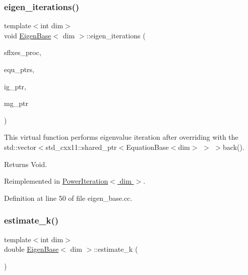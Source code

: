 \subsubsection{\texorpdfstring{eigen\+\_\+iterations()}{eigen\_iterations()}}
{\footnotesize\ttfamily template$<$int dim$>$ \\
void \hyperlink{class_eigen_base}{Eigen\+Base}$<$ dim $>$\+::eigen\+\_\+iterations (\begin{DoxyParamCaption}\item[{std\+::vector$<$ Vector$<$ double $>$ $>$ \&}]{sflxes\+\_\+proc,  }\item[{std\+::vector$<$ std\+\_\+cxx11\+::shared\+\_\+ptr$<$ \hyperlink{class_equation_base}{Equation\+Base}$<$ dim $>$ $>$ $>$ \&}]{equ\+\_\+ptrs,  }\item[{std\+\_\+cxx11\+::shared\+\_\+ptr$<$ \hyperlink{class_i_g_base}{I\+G\+Base}$<$ dim $>$ $>$}]{ig\+\_\+ptr,  }\item[{std\+\_\+cxx11\+::shared\+\_\+ptr$<$ \hyperlink{class_m_g_base}{M\+G\+Base}$<$ dim $>$ $>$}]{mg\+\_\+ptr }\end{DoxyParamCaption})\hspace{0.3cm}{\ttfamily [virtual]}}

This virtual function performs eigenvalue iteration after overriding with the std\+::vector$<$std\+\_\+cxx11\+::shared\+\_\+ptr$<$Equation\+Base$<$dim$>$ $>$ $>$back().

\begin{DoxyReturn}{Returns}
Void. 
\end{DoxyReturn}


Reimplemented in \hyperlink{class_power_iteration_a583586002126f8b7a523e95327047cba}{Power\+Iteration$<$ dim $>$}.



Definition at line 50 of file eigen\+\_\+base.\+cc.

\mbox{\label{class_eigen_base_a1ad5ce67d3534960731d34691db2f4d9}} 
\subsubsection{\texorpdfstring{estimate\+\_\+k()}{estimate\_k()}}
{\footnotesize\ttfamily template$<$int dim$>$ \\
double \hyperlink{class_eigen_base}{Eigen\+Base}$<$ dim $>$\+::estimate\+\_\+k (\begin{DoxyParamCaption}{ }\end{DoxyParamCaption})\hspace{0.3cm}{\ttfamily [protected]}}

